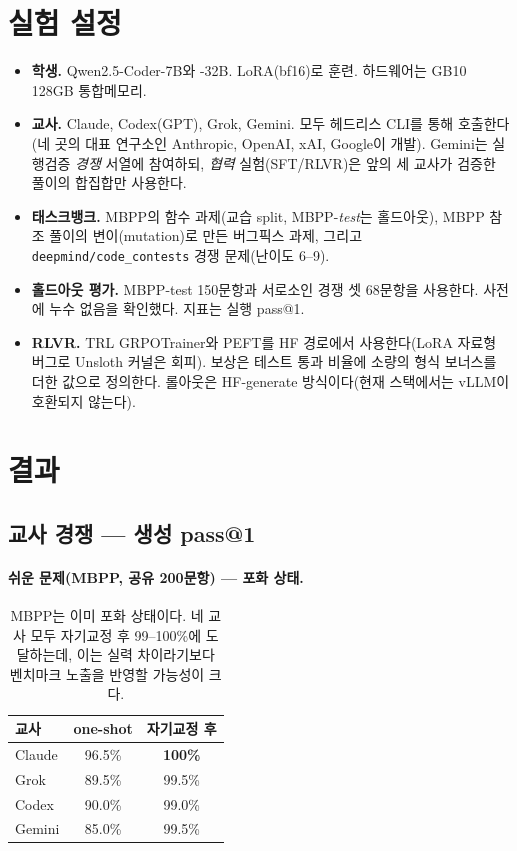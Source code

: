 \documentclass[11pt]{article}
\begin{document}
\section{실험 설정}
\begin{itemize}
  \item \textbf{학생.} Qwen2.5-Coder-7B와 -32B. LoRA(bf16)로 훈련. 하드웨어는 GB10 128GB 통합메모리.
  \item \textbf{교사.} Claude, Codex(GPT), Grok, Gemini. 모두 헤드리스 CLI를 통해 호출한다(네 곳의 대표 연구소인 Anthropic, OpenAI, xAI, Google이 개발). Gemini는 실행검증 \emph{경쟁} 서열에 참여하되, \emph{협력} 실험(SFT/RLVR)은 앞의 세 교사가 검증한 풀이의 합집합만 사용한다.
  \item \textbf{태스크뱅크.} MBPP의 함수 과제(교습 split, MBPP-\emph{test}는 홀드아웃), MBPP 참조 풀이의 변이(mutation)로 만든 버그픽스 과제, 그리고 \texttt{deepmind/code\_contests} 경쟁 문제(난이도 6--9).
  \item \textbf{홀드아웃 평가.} MBPP-test 150문항과 서로소인 경쟁 셋 68문항을 사용한다. 사전에 누수 없음을 확인했다. 지표는 실행 pass@1.
  \item \textbf{RLVR.} TRL GRPOTrainer와 PEFT를 HF 경로에서 사용한다(LoRA 자료형 버그로 Unsloth 커널은 회피). 보상은 테스트 통과 비율에 소량의 형식 보너스를 더한 값으로 정의한다. 롤아웃은 HF-generate 방식이다(현재 스택에서는 vLLM이 호환되지 않는다).
\end{itemize}

\section{결과}
\subsection{교사 경쟁 --- 생성 pass@1}
\paragraph{쉬운 문제(MBPP, 공유 200문항) --- 포화 상태.}
\begin{table}[h]\centering
\begin{tabular}{lcc}
\toprule
교사 & one-shot & 자기교정 후 \\
\midrule
Claude & 96.5\% & \textbf{100\%} \\
Grok   & 89.5\% & 99.5\% \\
Codex  & 90.0\% & 99.0\% \\
Gemini & 85.0\% & 99.5\% \\
\bottomrule
\end{tabular}
\caption{MBPP는 이미 포화 상태이다. 네 교사 모두 자기교정 후 99--100\%에 도달하는데, 이는 실력 차이라기보다 벤치마크 노출을 반영할 가능성이 크다.}
\end{table}
\end{document}

